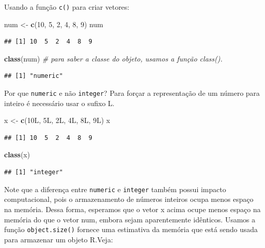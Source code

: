 \documentclass[]{book}
\newenvironment{Shaded}{\begin{snugshade}}{\end{snugshade}}
\newcommand{\CommentTok}[1]{\textcolor[rgb]{0.56,0.35,0.01}{\textit{#1}}}
\newcommand{\DecValTok}[1]{\textcolor[rgb]{0.00,0.00,0.81}{#1}}
\newcommand{\KeywordTok}[1]{\textcolor[rgb]{0.13,0.29,0.53}{\textbf{#1}}}
\newcommand{\NormalTok}[1]{#1}
\newcommand{\StringTok}[1]{\textcolor[rgb]{0.31,0.60,0.02}{#1}}
\begin{document}
Usando a função \texttt{c()} para criar vetores:

\begin{Shaded}
\begin{Highlighting}[]
\NormalTok{num <-}\StringTok{ }\KeywordTok{c}\NormalTok{(}\DecValTok{10}\NormalTok{, }\DecValTok{5}\NormalTok{, }\DecValTok{2}\NormalTok{, }\DecValTok{4}\NormalTok{, }\DecValTok{8}\NormalTok{, }\DecValTok{9}\NormalTok{)}
\NormalTok{num}
\end{Highlighting}
\end{Shaded}

\begin{verbatim}
## [1] 10  5  2  4  8  9
\end{verbatim}

\begin{Shaded}
\begin{Highlighting}[]
\KeywordTok{class}\NormalTok{(num) }\CommentTok{# para saber a classe do objeto, usamos a função class().}
\end{Highlighting}
\end{Shaded}

\begin{verbatim}
## [1] "numeric"
\end{verbatim}

Por que \texttt{numeric} e não \texttt{integer}? Para forçar a representação de um número para inteiro é necessário usar o sufixo L.

\begin{Shaded}
\begin{Highlighting}[]
\NormalTok{x <-}\StringTok{ }\KeywordTok{c}\NormalTok{(10L, 5L, 2L, 4L, 8L, 9L)}
\NormalTok{x}
\end{Highlighting}
\end{Shaded}

\begin{verbatim}
## [1] 10  5  2  4  8  9
\end{verbatim}

\begin{Shaded}
\begin{Highlighting}[]
\KeywordTok{class}\NormalTok{(x)}
\end{Highlighting}
\end{Shaded}

\begin{verbatim}
## [1] "integer"
\end{verbatim}

Note que a diferença entre \texttt{numeric} e \texttt{integer} também possui impacto computacional, pois o armazenamento de números inteiros ocupa menos espaço na memória. Dessa forma, esperamos que o vetor x acima ocupe menos espaço na memória do que o vetor num, embora sejam aparentemente idênticos. Usamos a função \texttt{object.size()} fornece uma estimativa da memória que está sendo usada para armazenar um objeto R.Veja:
\end{document}
